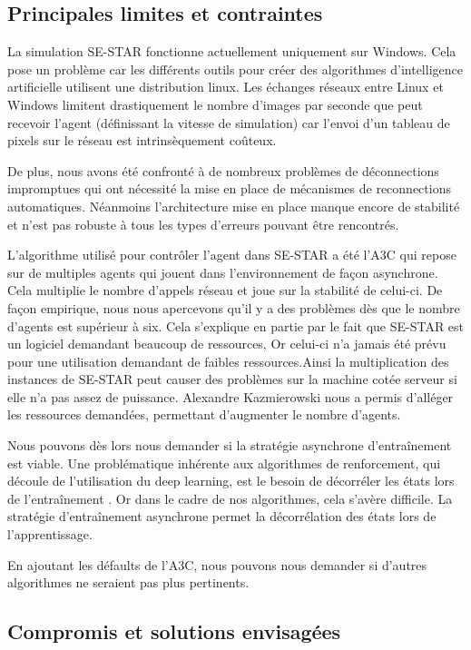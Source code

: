 \subsection{Principales limites et contraintes}

La simulation SE-STAR fonctionne actuellement uniquement sur Windows. Cela pose un problème car les différents outils pour créer des algorithmes d'intelligence artificielle utilisent une distribution linux. Les échanges réseaux entre Linux et Windows limitent drastiquement le nombre d'images par seconde que peut recevoir l'agent (définissant la vitesse de simulation) car l'envoi d'un tableau de pixels sur le réseau est intrinsèquement coûteux. 

De plus, nous avons été confronté à de nombreux problèmes de déconnections impromptues qui ont nécessité la mise en place de mécanismes de reconnections automatiques. Néanmoins l'architecture mise en place manque encore de stabilité et n'est pas robuste à tous les types d'erreurs pouvant être rencontrés.

L'algorithme utilisé pour contrôler l'agent dans SE-STAR a été l'\gls{A3C} qui repose sur de multiples agents qui jouent dans l'environnement de façon asynchrone. Cela multiplie le nombre d'appels réseau et joue sur la stabilité de celui-ci. De façon empirique, nous nous apercevons qu'il y a des problèmes dès que le nombre d'agents est supérieur à six. Cela s'explique en partie par le fait que SE-STAR est un logiciel demandant beaucoup de ressources, Or celui-ci n'a jamais été prévu pour une utilisation demandant de faibles ressources.Ainsi la multiplication des instances de SE-STAR peut causer des problèmes sur la machine cotée serveur si elle n'a pas assez de puissance. Alexandre  Kazmierowski nous a permis d'alléger les ressources demandées, permettant d'augmenter le nombre d'agents.

Nous pouvons dès lors nous demander si la stratégie asynchrone d'entraînement est viable.
Une problématique inhérente aux algorithmes de renforcement, qui découle de l'utilisation du deep learning, est le besoin de décorréler les états lors de l'entraînement . Or dans le cadre de nos algorithmes, cela s'avère difficile. La stratégie d'entraînement asynchrone permet la décorrélation des états lors de l'apprentissage.


En ajoutant les défaults de l'A3C, nous pouvons nous demander si d'autres algorithmes ne seraient pas plus pertinents.

\subsection{Compromis et solutions envisagées}

